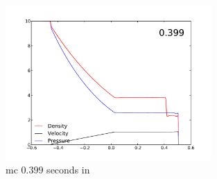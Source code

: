 \documentclass[11pt,letterpaper]{article}
\begin{document}
\begin{figure}[bth]
\centering
\includegraphics[width=0.7\textwidth]{mc.pdf}
\caption{mc $0.399$ seconds in}
\label{fig:6}
\end{figure}
\end{document}
